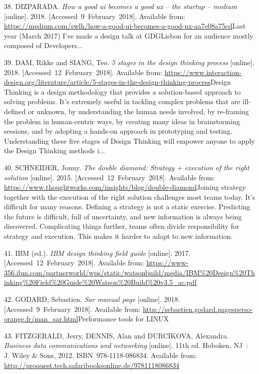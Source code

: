 \documentclass[american,a4paper,oneside,,tablecaptionabove]{scrbook}
\begin{document}
\hypertarget{ref-Dizparada.2018}{}
38. DIZPARADA. \emph{How a good ui becomes a good ux -- the startup --
medium} {[}online{]}. 2018. {[}Accessed~9~February~2018{]}. Available
from:
\url{https://medium.com/swlh/how-a-good-ui-becomes-a-good-ux-aa7e08a75cd}Last
year (March 2017) I've made a design talk at GDGLisbon for an audience
mostly composed of Developers\(\ldots\)

\hypertarget{ref-Dam.2018}{}
39. DAM, Rikke and SIANG, Teo. \emph{5 stages in the design thinking
process} {[}online{]}. 2018. {[}Accessed~12~February~2018{]}. Available
from:
\url{https://www.interaction-design.org/literature/article/5-stages-in-the-design-thinking-process}Design
Thinking is a design methodology that provides a solution-based approach
to solving problems. It's extremely useful in tackling complex problems
that are ill-defined or unknown, by understanding the human needs
involved, by re-framing the problem in human-centric ways, by creating
many ideas in brainstorming sessions, and by adopting a hands-on
approach in prototyping and testing. Understanding these five stages of
Design Thinking will empower anyone to apply the Design Thinking methods
i...

\hypertarget{ref-Schneider.2015}{}
40. SCHNEIDER, Jonny. \emph{The double diamond: Strategy + execution of
the right solution} {[}online{]}. 2015. {[}Accessed~12~February~2018{]}.
Available from:
\url{https://www.thoughtworks.com/insights/blog/double-diamond}Joining
strategy together with the execution of the right solution challenges
most teams today. It's difficult for many reasons. Defining a strategy
is not a static exercise. Predicting the future is difficult, full of
uncertainty, and new information is always being discovered.
Complicating things further, teams often divide responsibility for
strategy and execution. This makes it harder to adapt to new
information.

\hypertarget{ref-IBM.2017}{}
41. IBM (ed.). \emph{IBM design thinking field guide} {[}online{]}.
2017. {[}Accessed~12~February~2018{]}. Available from:
\url{https://www-356.ibm.com/partnerworld/wps/static/watsonbuild/media/IBM\%20Design\%20Thinking\%20Field\%20Guide\%20Watson\%20Build\%20v3.5_ac.pdf}

\hypertarget{ref-Godard.2018}{}
42. GODARD, Sebastien. \emph{Sar manual page} {[}online{]}. 2018.
{[}Accessed~9~February~2018{]}. Available from:
\url{http://sebastien.godard.pagesperso-orange.fr/man_sar.html}Performance
tools for LINUX

\hypertarget{ref-FitzGerald.2012}{}
43. FITZGERALD, Jerry, DENNIS, Alan and DURCIKOVA, Alexandra.
\emph{Business data communications and networking} {[}online{]}. 11th
ed. Hoboken, NJ~: J. Wiley \& Sons, 2012. ISBN~978-1118-086834.
Available from:
\url{http://proquest.tech.safaribooksonline.de/9781118086834}
\end{document}
